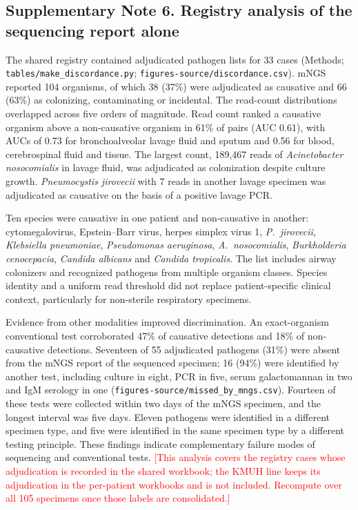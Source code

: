 \documentclass[11pt,a4paper]{article}
\newcommand{\mngs}{mNGS\xspace}
\newcommand{\kmuh}{KMUH\xspace}
\newcommand{\todo}[1]{\textcolor{red}{[#1]}}
\begin{document}
\subsection*{Supplementary Note 6. Registry analysis of the sequencing report alone}
The shared registry contained adjudicated pathogen lists for 33 cases (Methods; \texttt{tables/make\_discordance.py}; \texttt{figures-source/discordance.csv}). \mngs reported 104 organisms, of which 38 (37\%) were adjudicated as causative and 66 (63\%) as colonizing, contaminating or incidental. The read-count distributions overlapped across five orders of magnitude. Read count ranked a causative organism above a non-causative organism in 61\% of pairs (AUC 0.61), with AUCs of 0.73 for bronchoalveolar lavage fluid and sputum and 0.56 for blood, cerebrospinal fluid and tissue. The largest count, 189,467 reads of \textit{Acinetobacter nosocomialis} in lavage fluid, was adjudicated as colonization despite culture growth. \textit{Pneumocystis jirovecii} with 7 reads in another lavage specimen was adjudicated as causative on the basis of a positive lavage PCR.

Ten species were causative in one patient and non-causative in another: cytomegalovirus, Epstein--Barr virus, herpes simplex virus 1, \textit{P.~jirovecii}, \textit{Klebsiella pneumoniae}, \textit{Pseudomonas aeruginosa}, \textit{A.~nosocomialis}, \textit{Burkholderia cenocepacia}, \textit{Candida albicans} and \textit{Candida tropicalis}. The list includes airway colonizers and recognized pathogens from multiple organism classes. Species identity and a uniform read threshold did not replace patient-specific clinical context, particularly for non-sterile respiratory specimens.

Evidence from other modalities improved discrimination. An exact-organism conventional test corroborated 47\% of causative detections and 18\% of non-causative detections. Seventeen of 55 adjudicated pathogens (31\%) were absent from the \mngs report of the sequenced specimen; 16 (94\%) were identified by another test, including culture in eight, PCR in five, serum galactomannan in two and IgM serology in one (\texttt{figures-source/missed\_by\_mngs.csv}). Fourteen of these tests were collected within two days of the \mngs specimen, and the longest interval was five days. Eleven pathogens were identified in a different specimen type, and five were identified in the same specimen type by a different testing principle. These findings indicate complementary failure modes of sequencing and conventional tests. \todo{This analysis covers the registry cases whose adjudication is recorded in the shared workbook; the \kmuh line keeps its adjudication in the per-patient workbooks and is not included. Recompute over all 105 specimens once those labels are consolidated.}

\clearpage

\end{document}
